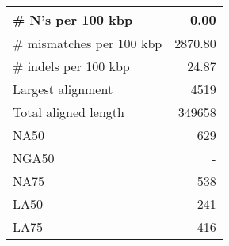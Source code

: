 \documentclass[12pt,a4paper]{article}
\begin{document}
\begin{table}[ht]
\begin{center}
\begin{tabular}{|l*{1}{|r}|}
\# N's per 100 kbp & 0.00 \\ \hline
\# mismatches per 100 kbp & 2870.80 \\ \hline
\# indels per 100 kbp & 24.87 \\ \hline
Largest alignment & 4519 \\ \hline
Total aligned length & 349658 \\ \hline
NA50 & 629 \\ \hline
NGA50 & - \\ \hline
NA75 & 538 \\ \hline
LA50 & 241 \\ \hline
LA75 & 416 \\ \hline
\end{tabular}
\end{center}
\end{table}
\end{document}
